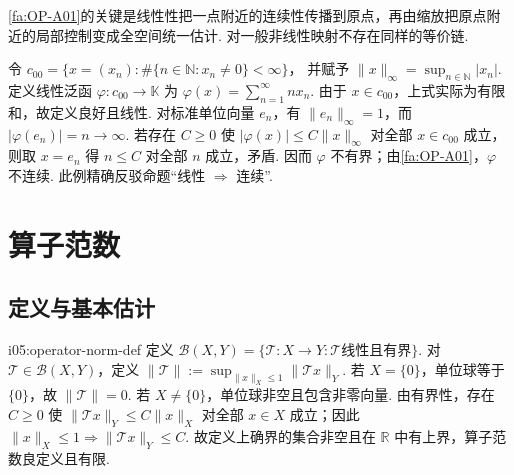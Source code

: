 \begin{FARemark}[线性结构的特殊作用]
\autoref{fa:OP-A01}的关键是线性性把一点附近的连续性传播到原点，再由缩放把原点附近的局部控制变成全空间统一估计. 对一般非线性映射不存在同样的等价链.
\end{FARemark}

\begin{FACounterexample}[线性不蕴含连续]\label{i05:ce-discont-lin}
令 \(\displaystyle c_{00} =\{x=(x_n):\#\{n\in\mathbb N:x_n\neq0\}<\infty\}\)，
并赋予 \(\displaystyle \|x\|_\infty=\sup_{n\in\mathbb N}|x_n|\). 定义线性泛函 \(\displaystyle \varphi:c_{00}\to\mathbb K\) 为 \(\displaystyle \varphi(x)=\sum_{n=1}^{\infty}n x_n\).
由于 \(\displaystyle x\in c_{00}\)，上式实际为有限和，故定义良好且线性. 对标准单位向量 \(\displaystyle e_n\)，有 \(\displaystyle \|e_n\|_\infty=1\)，而 \(\displaystyle |\varphi(e_n)|=n\to\infty\). 若存在 \(\displaystyle C\geqslant0\) 使 \(\displaystyle |\varphi(x)|\leqslant C\|x\|_\infty\) 对全部 \(\displaystyle x\in c_{00}\) 成立，则取 \(\displaystyle x=e_n\) 得 \(\displaystyle n\leqslant C\) 对全部 \(\displaystyle n\) 成立，矛盾. 因而 \(\displaystyle \varphi\) 不有界；由\autoref{fa:OP-A01}，\(\displaystyle \varphi\) 不连续. 此例精确反驳命题“线性 \(\displaystyle \Rightarrow\) 连续”.
\end{FACounterexample}

\section{算子范数}\label{sec:i05-operator-norm}

\subsection{定义与基本估计}

\begin{FADefinition}[A][有界算子空间与算子范数]{i05:operator-norm-def}
定义 \(\displaystyle \mathcal B(X,Y) =\{\mathcal T:X\to Y:\mathcal T\text{线性且有界}\}\).
对 \(\displaystyle \mathcal T\in\mathcal B(X,Y)\)，定义 \(\displaystyle \|\mathcal T\| :=\sup_{\|x\|_X\leqslant1}\|\mathcal T x\|_Y\).
若 \(\displaystyle X=\{0\}\)，单位球等于 \(\displaystyle\{0\}\)，故 \(\displaystyle \|\mathcal T\|=0\). 若 \(\displaystyle X\neq\{0\}\)，单位球非空且包含非零向量. 由有界性，存在 \(\displaystyle C\geqslant0\) 使 \(\displaystyle \|\mathcal T x\|_Y\leqslant C\|x\|_X\) 对全部 \(\displaystyle x\in X\) 成立；因此 \(\displaystyle \|x\|_X\leqslant1\Rightarrow\|\mathcal T x\|_Y\leqslant C\). 故定义上确界的集合非空且在 \(\displaystyle \mathbb R\) 中有上界，算子范数良定义且有限.
\end{FADefinition}

